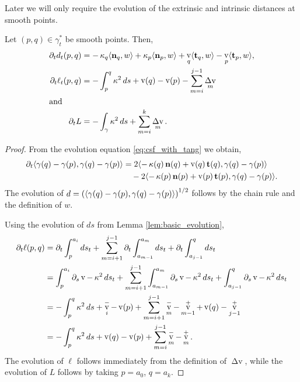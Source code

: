 \documentclass[11pt]{amsart}
\DeclareMathOperator{\tangspeed}{v}
\DeclareMathOperator{\corneranglespeed}{{\Delta v}}
\begin{document}
Later we will only require the evolution of the extrinsic and intrinsic distances at smooth points.

\begin{lemma}
\label{lem:distance_evolution}

Let \((p,q) \in \gamma_t^{\ast}\) be smooth points. Then,
\begin{align*}
\partial_t d_t(p, q) &= -\curvecurv_q \ip{\nor_q}{w} + \curvecurv_p \ip{\nor_p}{w} + \tangspeed_q \ip{\tang_q}{w} - \tangspeed_p \ip{\tang_p}{w}, \\
\partial_t \ell_t(p, q) &= - \int_p^q \curvecurv^2 ds + \tangspeed(q) - \tangspeed(p) - \sum_{m=i}^{j-1} \corneranglespeed_m \\
\intertext{and}
\partial_t L &= - \int_{\gamma} \curvecurv^2 ds + \sum_{m=i}^{k} \corneranglespeed_m.
\end{align*}
\end{lemma}

\begin{proof}
From the evolution equation \eqref{eq:csf_with_tang} we obtain,
\[
\begin{split}
\partial_t \ip{\gamma(q) - \gamma(p)}{\gamma(q) - \gamma(p)} &= 2 \ip{-\curvecurv(q) \nor(q) + \tangspeed(q) \tang(q)}{\gamma(q) - \gamma(p)} \\
&\quad  - 2 \ip{-\curvecurv(p) \nor(p) + \tangspeed(p) \tang(p)}{\gamma(q) - \gamma(p)}.
\end{split}
\]
The evolution of \(d = \left(\langle{\gamma(q) - \gamma(p)},{\gamma(q) - \gamma(p)}\rangle\right)^{1/2}\) follows by the chain rule and the definition of \(w\).

Using the evolution of \(ds\) from Lemma \ref{lem:basic_evolution},
\begin{align*}
\partial_t \ell(p,q) &= \partial_t \int_p^{a_i} ds_t + \sum_{m=i+1}^{j-1} \partial_t \int_{a_{m-1}}^{a_m} ds_t + \partial_t  \int_{a_{j-1}}^q ds_t \\
&= \int_p^{a_i} \partial_s \tangspeed - \curvecurv^2 ds_t + \sum_{m=i+1}^{j-1} \int_{a_{m-1}}^{a_m} \partial_s \tangspeed - \curvecurv^2 ds_t + \int_{a_{j-1}}^q \partial_s \tangspeed - \curvecurv^2 ds_t \\
&= -\int_p^q \curvecurv^2 ds + \tangspeed_i^- - \tangspeed(p) + \sum_{m=i+1}^{j-1} \tangspeed_m^- - \tangspeed_{m-1}^+ + \tangspeed(q) - \tangspeed_{j-1}^+ \\
&= -\int_p^q \curvecurv^2 ds + \tangspeed(q) - \tangspeed(p) + \sum_{m=i}^{j-1} \tangspeed_m^- - \tangspeed_m^+.
\end{align*}
The evolution of \(\ell\) follows immediately from the definition of \(\corneranglespeed\), while the evolution of \(L\) follows by taking \(p=a_0\), \(q=a_k\).
\end{proof}
\end{document}
